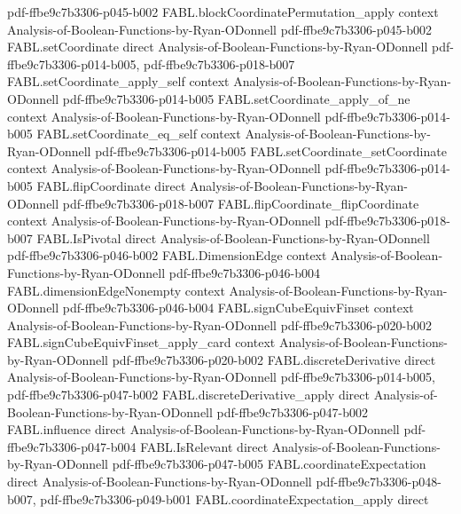 \begin{theorem}
  {pdf-ffbe9c7b3306-p045-b002}
\proofstep
  {FABL.blockCoordinatePermutation_apply}
  {context}
  {Analysis-of-Boolean-Functions-by-Ryan-ODonnell}
  {pdf-ffbe9c7b3306-p045-b002}
\proofstep
  {FABL.setCoordinate}
  {direct}
  {Analysis-of-Boolean-Functions-by-Ryan-ODonnell}
  {pdf-ffbe9c7b3306-p014-b005,
    pdf-ffbe9c7b3306-p018-b007}
\proofstep
  {FABL.setCoordinate_apply_self}
  {context}
  {Analysis-of-Boolean-Functions-by-Ryan-ODonnell}
  {pdf-ffbe9c7b3306-p014-b005}
\proofstep
  {FABL.setCoordinate_apply_of_ne}
  {context}
  {Analysis-of-Boolean-Functions-by-Ryan-ODonnell}
  {pdf-ffbe9c7b3306-p014-b005}
\proofstep
  {FABL.setCoordinate_eq_self}
  {context}
  {Analysis-of-Boolean-Functions-by-Ryan-ODonnell}
  {pdf-ffbe9c7b3306-p014-b005}
\proofstep
  {FABL.setCoordinate_setCoordinate}
  {context}
  {Analysis-of-Boolean-Functions-by-Ryan-ODonnell}
  {pdf-ffbe9c7b3306-p014-b005}
\proofstep
  {FABL.flipCoordinate}
  {direct}
  {Analysis-of-Boolean-Functions-by-Ryan-ODonnell}
  {pdf-ffbe9c7b3306-p018-b007}
\proofstep
  {FABL.flipCoordinate_flipCoordinate}
  {context}
  {Analysis-of-Boolean-Functions-by-Ryan-ODonnell}
  {pdf-ffbe9c7b3306-p018-b007}
\proofstep
  {FABL.IsPivotal}
  {direct}
  {Analysis-of-Boolean-Functions-by-Ryan-ODonnell}
  {pdf-ffbe9c7b3306-p046-b002}
\proofstep
  {FABL.DimensionEdge}
  {context}
  {Analysis-of-Boolean-Functions-by-Ryan-ODonnell}
  {pdf-ffbe9c7b3306-p046-b004}
\proofstep
  {FABL.dimensionEdgeNonempty}
  {context}
  {Analysis-of-Boolean-Functions-by-Ryan-ODonnell}
  {pdf-ffbe9c7b3306-p046-b004}
\proofstep
  {FABL.signCubeEquivFinset}
  {context}
  {Analysis-of-Boolean-Functions-by-Ryan-ODonnell}
  {pdf-ffbe9c7b3306-p020-b002}
\proofstep
  {FABL.signCubeEquivFinset_apply_card}
  {context}
  {Analysis-of-Boolean-Functions-by-Ryan-ODonnell}
  {pdf-ffbe9c7b3306-p020-b002}
\proofstep
  {FABL.discreteDerivative}
  {direct}
  {Analysis-of-Boolean-Functions-by-Ryan-ODonnell}
  {pdf-ffbe9c7b3306-p014-b005,
    pdf-ffbe9c7b3306-p047-b002}
\proofstep
  {FABL.discreteDerivative_apply}
  {direct}
  {Analysis-of-Boolean-Functions-by-Ryan-ODonnell}
  {pdf-ffbe9c7b3306-p047-b002}
\proofstep
  {FABL.influence}
  {direct}
  {Analysis-of-Boolean-Functions-by-Ryan-ODonnell}
  {pdf-ffbe9c7b3306-p047-b004}
\proofstep
  {FABL.IsRelevant}
  {direct}
  {Analysis-of-Boolean-Functions-by-Ryan-ODonnell}
  {pdf-ffbe9c7b3306-p047-b005}
\proofstep
  {FABL.coordinateExpectation}
  {direct}
  {Analysis-of-Boolean-Functions-by-Ryan-ODonnell}
  {pdf-ffbe9c7b3306-p048-b007,
    pdf-ffbe9c7b3306-p049-b001}
\proofstep
  {FABL.coordinateExpectation_apply}
  {direct}

\end{theorem}
